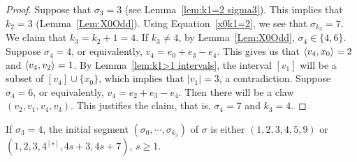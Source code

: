 \begin{proof}
Suppose that $\sigma_3=3$ (see Lemma~\ref{lem:k1=2 sigma3}). This implies that $k_2=3$ (Lemma~\ref{Lem:X0Odd}). Using Equation~\eqref{x0k1=2}, we see that $\sigma_{k_3}=7$. We claim that $k_3=k_2+1=4$. If $k_3\neq 4$, by Lemma~\ref{Lem:X0Odd}, $\sigma_4\in \{ 4, 6\}$. Suppose $\sigma_4=4$, or equivalently, $v_4=e_0+e_3-e_4$. This gives us that $\left\langle v_4 , x_0 \right\rangle=2$ and $\left\langle v_4 , v_2 \right\rangle=1$. By Lemma~\ref{lem:k1>1 intervals}, the interval $[v_1]$ will be a subset of $[v_4]\cup\{x_0\}$, which implies that $|v_1|= 3$, a contradiction. Suppose $\sigma_4=6$, or equivalently, $v_4=e_2+e_3-e_4$. Then there will be a claw $(v_2, v_1, v_4, v_3)$. This justifies the claim, that is, $\sigma_4=7$ and $k_3=4$. 
\end{proof}

\begin{prop}\label{lem:k1>1,2t+1}
If $\sigma_3=4$, the initial segment $(\sigma_0, \cdots, \sigma_{k_3})$ of $\sigma$ is either $(1,2,3,4,5,9)$ or $(1,2,3,4^{[s]}, 4s+3,4s+7)$, $s\ge1$.
\end{prop}

